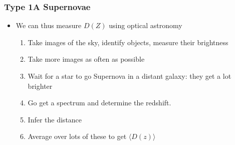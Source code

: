 \documentclass{beamer}
\begin{document}
\frame
{

    \frametitle{Type 1A Supernovae}


    \begin{itemize}

        \item We can thus measure $D(Z)$ using optical astronomy 

            \begin{enumerate}

                \item Take images of the sky, identify objects, measure their brightness

                \item Take more images as often as possible

                \item Wait for a star to go Supernova in a distant
                    galaxy: they get a lot brighter

                \item Go get a spectrum and determine the redshift.

                \item Infer the distance

                \item Average over lots of these to get {\color{gold} $\langle
                    D(z) \rangle$ }

            \end{enumerate}

    \end{itemize}

}
\end{document}
